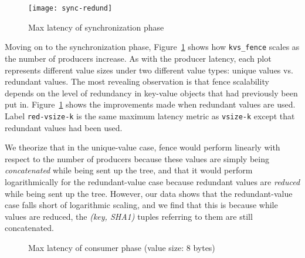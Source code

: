\begin{figure}
\centering
\texttt{[image: sync-redund]}
\caption{Max latency of synchronization phase}
\vspace{-.7cm}	
\label{fig:sync}
\end{figure}
 

Moving on to the synchronization phase, Figure~\ref{fig:sync} shows 
how {\tt kvs\_fence} scales as the number of producers increase. 
As with the producer latency,
each plot represents different value sizes under two different
value types: unique values vs. redundant values.
The most revealing observation is that
fence scalability depends on the level of
redundancy in key-value objects that had previously 
been put in. Figure~\ref{fig:sync} 
shows the improvements made when redundant values are used. 
Label {\tt red-vsize-k} is the same maximum latency metric
as {\tt vsize-k} except that 
redundant values had been used.

We theorize that in the unique-value case, fence would perform 
linearly with respect to the number of
producers because these values are simply being {\em concatenated} while
being sent up the tree, and that it would perform logarithmically for the
redundant-value case
because redundant values are {\em reduced} while being sent 
up the tree. However, our data shows that the redundant-value case
falls short of logarithmic scaling, and we find that this is
because while values are reduced, the {\em (key, SHA1)} tuples
referring to them are still concatenated.

%
\begin{figure}[ht]
\centering
\begin{subfigure}[With single-directory layout]{
  \texttt{[image: consumer-1-dir]}
  \label{fig:cons:dir}
}%
\end{subfigure}
\begin{subfigure}[Improvements with multiple directories]{
  \texttt{[image: consumer-dist-dir]}
  \label{fig:cons:dirs}
}%
\end{subfigure}
\caption{Max latency of consumer phase (value size: 8 bytes)}
\vspace{-.3cm}
\label{fig:consumer}
\end{figure}

